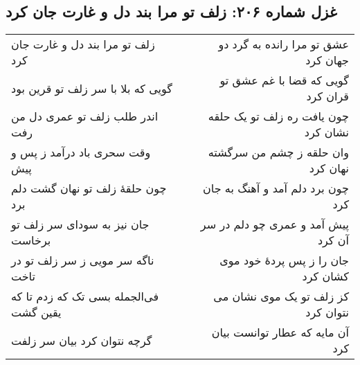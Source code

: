 \begin{center}
\section*{غزل شماره ۲۰۶: زلف تو مرا بند دل و غارت جان کرد}
\label{sec:206}
\begin{longtable}{l p{0.5cm} r}
زلف تو مرا بند دل و غارت جان کرد
&&
عشق تو مرا رانده به گرد دو جهان کرد
\\
گویی که بلا با سر زلف تو قرین بود
&&
گویی که قضا با غم عشق تو قران کرد
\\
اندر طلب زلف تو عمری دل من رفت
&&
چون یافت ره زلف تو یک حلقه نشان کرد
\\
وقت سحری باد درآمد ز پس و پیش
&&
وان حلقه ز چشم من سرگشته نهان کرد
\\
چون حلقهٔ زلف تو نهان گشت دلم برد
&&
چون برد دلم آمد و آهنگ به جان کرد
\\
جان نیز به سودای سر زلف تو برخاست
&&
پیش آمد و عمری چو دلم در سر آن کرد
\\
ناگه سر مویی ز سر زلف تو در تاخت
&&
جان را ز پس پردهٔ خود موی کشان کرد
\\
فی‌الجمله بسی تک که زدم تا که یقین گشت
&&
کز زلف تو یک موی نشان می نتوان کرد
\\
گرچه نتوان کرد بیان سر زلفت
&&
آن مایه که عطار توانست بیان کرد
\\
\end{longtable}
\end{center}
